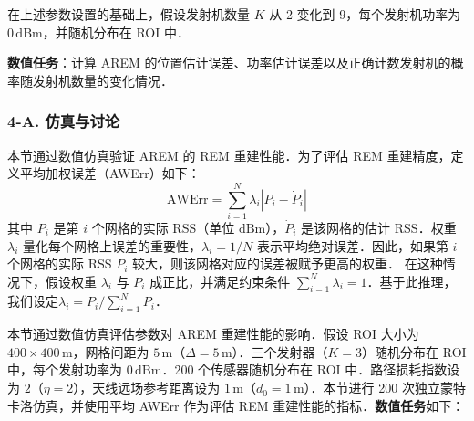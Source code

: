 \documentclass[a4paper,zihao=-4]{ctexart}
\begin{document}
在上述参数设置的基础上，假设发射机数量 $K$ 从 2 变化到 9，每个发射机功率为 $0\,\mathrm{dBm}$，并随机分布在 ROI 中．

\textbf{数值任务}：计算 AREM 的位置估计误差、功率估计误差以及正确计数发射机的概率随发射机数量的变化情况．





\subsubsection*{4-A. 仿真与讨论}
本节通过数值仿真验证 AREM 的 REM 重建性能．为了评估 REM 重建精度，定义平均加权误差（AWErr）如下：
\begin{equation}
    \label{eq:awerr}
    \mathrm{AWErr} = \sum_{i=1}^{N} \lambda_i \left| P_i - \dot{P}_i \right|
\end{equation}
其中 $P_i$ 是第 $i$ 个网格的实际 RSS（单位 $\mathrm{dBm}$），$\dot{P}_i$ 是该网格的估计 RSS．权重 $\lambda_i$ 量化每个网格上误差的重要性，$\lambda_i = 1/N$ 表示平均绝对误差．因此，如果第 $i$ 个网格的实际 RSS $P_i$ 较大，则该网格对应的误差被赋予更高的权重．
在这种情况下，假设权重 $\lambda_i$ 与 $P_i$ 成正比，并满足约束条件 $\sum_{i=1}^{N} \lambda_i = 1$．基于此推理，我们设定$\lambda_i = P_i \big/ \sum_{i=1}^{N} P_i$．

本节通过数值仿真评估参数对 AREM 重建性能的影响．假设 ROI 大小为 $400 \times 400\,\mathrm{m}$，网格间距为 $5\,\mathrm{m}$（$\Delta = 5\,\mathrm{m}$）．三个发射器（$K = 3$）随机分布在 ROI 中，每个发射功率为 $0\,\mathrm{dBm}$．200 个传感器随机分布在 ROI 中．路径损耗指数设为 $2$（$\eta = 2$），天线远场参考距离设为 $1\,\mathrm{m}$（$d_0 = 1\,\mathrm{m}$）．本节进行 200 次独立蒙特卡洛仿真，并使用平均 AWErr 作为评估 REM 重建性能的指标．\textbf{数值任务}如下：

\end{document}
